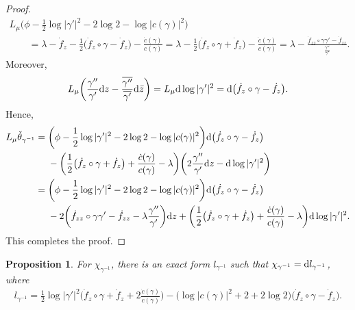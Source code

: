 \documentclass[pdftex]{sigma}%
\numberwithin{equation}{section}
\newtheorem{Proposition}[Theorem]{Proposition}
 { \theoremstyle{definition}
\newtheorem{Remark}[Theorem]{Remark} }
\begin{document}
\begin{proof}
\begin{gather*}
L_{\mu}\bigg(\phi-\frac{1}{2}\log|\gamma'|^2-2\log2-\log|c(\gamma)|^2\bigg)
\\ \qquad
{}=\lambda -\dot{f}_z-\frac{1}{2}\big(\dot{f}_z\circ\gamma-\dot{f}_z\big)
-\frac{\dot{c}(\gamma)}{c(\gamma)}
=\lambda -\frac{1}{2}\big(\dot{f}_z\circ\gamma+\dot{f}_z\big)-\frac{\dot{c}(\gamma)}{c(\gamma)}
=\lambda-\frac{\dot{f}_{zz}\circ\gamma\gamma'\!-\dot{f}_{zz}}{\frac{\gamma''}{\gamma'}}.
\end{gather*}
Moreover,
\begin{gather*}
L_{\mu}\bigg(\frac{\gamma''}{\gamma'}{\rm d}z-\frac{\overline{\gamma''}}{\overline{\gamma'}}{\rm d}\bar{z}\bigg)=L_{\mu}{\rm d}\log|\gamma'|^2={\rm d}\big(\dot{f}_z\circ\gamma-\dot{f}_z\big).
\end{gather*}
Hence,
\begin{align*}
L_{\mu}\check{\theta}_{\gamma^{-1}}
={}&\bigg(\phi-\frac{1}{2}\log|\gamma'|^2-2\log2-\log|c(\gamma)|^2\bigg)
{\rm d}\big(\dot{f}_z\circ\gamma-\dot{f}_z\big)
\\
&-\bigg( \frac{1}{2}\big(\dot{f}_z\circ\gamma+\dot{f}_z\big)
+\frac{\dot{c}(\gamma)}{c(\gamma)}-\lambda \bigg)\bigg(2\frac{\gamma''}{\gamma'}{\rm d}z-{\rm d}\log|\gamma'|^2\bigg)
\\
={}&\bigg(\phi-\frac{1}{2}\log|\gamma'|^2-2\log2-\log|c(\gamma)|^2\bigg)
{\rm d}\big(\dot{f}_z\circ\gamma-\dot{f}_z\big)
\\
&-2\bigg(\dot{f}_{zz}\circ\gamma\gamma'-\dot{f}_{zz}-\lambda\frac{\gamma''}{\gamma'} \bigg){\rm d}z
+\bigg( \frac{1}{2}\big(\dot{f}_z\circ\gamma+\dot{f}_z\big)
+\frac{\dot{c}(\gamma)}{c(\gamma)}-\lambda \bigg){\rm d}\log|\gamma'|^2.
\end{align*}
This completes the proof.
\end{proof}

\begin{Proposition}\label{p:exact-l} For $\chi_{\gamma^{-1}}$, there is an exact form $l_{\gamma^{-1}}$ such that $\chi_{\gamma^{-1}}={\rm d}l_{\gamma^{-1}}$, where
\begin{gather*}
l_{\gamma^{-1}}=\frac{1}{2}\log|\gamma'|^2\bigg(\dot{f}_z\circ\gamma +\dot{f}_z+2\frac{\dot{c}(\gamma)}{c(\gamma)}\bigg)
-\big(\log|c(\gamma)|^2+2+2\log 2\big)\big(\dot{f}_z\circ\gamma-\dot{f}_z\big).
\end{gather*}
\end{Proposition}
\end{document}
